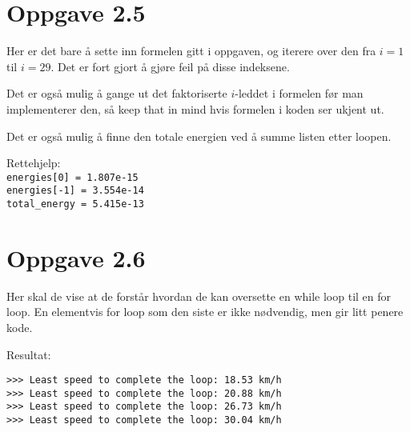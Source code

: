 \documentclass[10pt,a4paper]{article}
\begin{document}
\section*{Oppgave 2.5}
Her er det bare å sette inn formelen gitt i oppgaven, og iterere over den fra $i=1$ til $i=29$. Det er fort gjort å gjøre feil på disse indeksene.

Det er også mulig å gange ut det faktoriserte $i$-leddet i formelen før man implementerer den, så keep that in mind hvis formelen i koden ser ukjent ut.

Det er også mulig å finne den totale energien ved å summe listen etter loopen.



Rettehjelp:\\
\texttt{energies[0] = 1.807e-15}\\
\texttt{energies[-1] = 3.554e-14}\\
\texttt{total\_energy = 5.415e-13}

\section*{Oppgave 2.6}
Her skal de vise at de forstår hvordan de kan oversette en while loop til en for loop. En elementvis for loop som den siste er ikke nødvendig, men gir litt penere kode. 

Resultat:
\begin{verbatim}
>>> Least speed to complete the loop: 18.53 km/h
>>> Least speed to complete the loop: 20.88 km/h
>>> Least speed to complete the loop: 26.73 km/h
>>> Least speed to complete the loop: 30.04 km/h
\end{verbatim}
\end{document}
